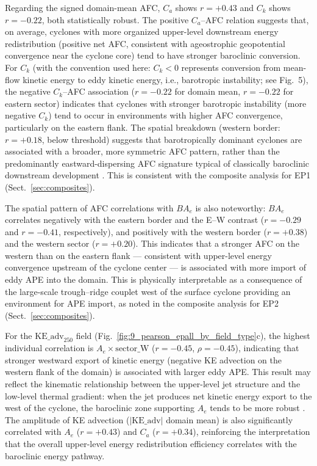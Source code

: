 Regarding the signed domain-mean AFC, $C_a$ shows $r = +0.43$ and $C_k$ shows
$r = -0.22$, both statistically robust. The positive $C_a$–AFC relation suggests that,
on average, cyclones with more organized upper-level downstream energy redistribution
(positive net AFC, consistent with ageostrophic geopotential convergence near the
cyclone core) \citep{pinheiro2022contributions,pinheiro2024deepening} tend to have
stronger baroclinic conversion. For $C_k$ (with the convention used here:
$C_k < 0$ represents conversion from mean-flow kinetic energy to eddy kinetic energy,
i.e., barotropic instability; see Fig.~5), the negative $C_k$–AFC association
($r = -0.22$ for domain mean, $r = -0.22$ for eastern sector) indicates that cyclones
with stronger barotropic instability (more negative $C_k$) tend to occur in
environments with higher AFC convergence, particularly on the eastern flank. The spatial
breakdown (western border: $r = +0.18$, below threshold) suggests that barotropically
dominant cyclones are associated with a broader, more symmetric AFC pattern, rather
than the predominantly eastward-dispersing AFC signature typical of classically
baroclinic downstream development \citep{orlanski1991life}. This is consistent with the
composite analysis for EP1 (Sect.~\ref{sec:composites}).

The spatial pattern of AFC correlations with $BA_e$ is also noteworthy:
$BA_e$ correlates negatively with the eastern border and the E–W contrast
($r = -0.29$ and $r = -0.41$, respectively), and positively with the western border
($r = +0.38$) and the western sector ($r = +0.20$). This indicates that a stronger
AFC on the western than on the eastern flank — consistent with upper-level energy
convergence upstream of the cyclone center — is associated with more import of eddy
APE into the domain. This is physically interpretable as a consequence of the
large-scale trough–ridge couplet west of the surface cyclone providing an environment
for APE import, as noted in the composite analysis for EP2
(Sect.~\ref{sec:composites}).


For the $\mathrm{KE\_adv}_{250}$ field (Fig.~\ref{fig:9_pearson_epall_by_field_type}c),
the highest individual correlation is $A_e \times \mathrm{sector\_W}$
($r = -0.45$, $\rho = -0.45$), indicating that stronger westward export of kinetic
energy (negative KE advection on the western flank of the domain) is associated with
larger eddy APE. This result may reflect the kinematic relationship between the upper-level
jet structure and the low-level thermal gradient: when the jet produces net kinetic
energy export to the west of the cyclone, the baroclinic zone supporting $A_e$ tends to
be more robust \citep{de2025lorenz}. The amplitude of KE advection ($|\mathrm{KE\_adv}|$
domain mean) is also significantly correlated with $A_e$ ($r = +0.43$) and $C_a$
($r = +0.34$), reinforcing the interpretation that the overall upper-level energy
redistribution efficiency correlates with the baroclinic energy pathway.


